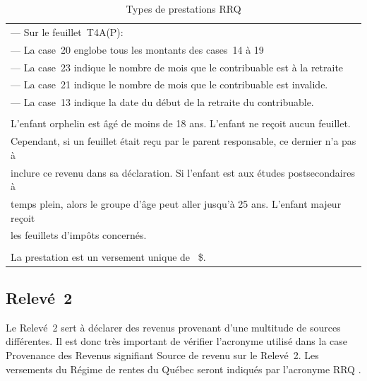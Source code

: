 \begin{table}
\begin{tabular}{|l|c|c|l|}
		\multicolumn{4}{|l|}{--- Sur le feuillet~T4A(P):}                                                            \\
		\multicolumn{4}{|l|}{\quad --- La case~20 englobe tous les montants des cases~14 à 19}                       \\
		\multicolumn{4}{|l|}{\quad --- La case~23 indique le nombre de mois que le contribuable est à la retraite}   \\
		\multicolumn{4}{|l|}{\quad --- La case~21 indique le nombre de mois que le contribuable est invalide.}       \\
		\multicolumn{4}{|l|}{\quad --- La case~13 indique la date du début de la retraite du contribuable.}          \\
		\multicolumn{4}{|l|}{ }                                                                                      \\
		\multicolumn{4}{|l|}{\up{1}L'enfant orphelin est âgé de moins de 18 ans. L'enfant ne reçoit aucun feuillet.} \\
		\multicolumn{4}{|l|}{Cependant, si un feuillet était reçu par le parent responsable, ce dernier n'a pas à}   \\
		\multicolumn{4}{|l|}{inclure ce revenu dans sa déclaration. Si l'enfant est aux études postsecondaires à}    \\
		\multicolumn{4}{|l|}{temps plein, alors le groupe d'âge peut aller jusqu'à 25 ans. L'enfant majeur reçoit}   \\
		\multicolumn{4}{|l|}{les feuillets d'impôts concernés.}                                                      \\
		\multicolumn{4}{|l|}{ }                                                                                      \\
		\multicolumn{4}{|l|}{\up{2}La prestation est un versement unique de \numprint{2500}~\$.}                     \\ \hline
	\end{tabular}
	\caption{Types de prestations RRQ}
	\label{table:prestationsRRQ}
\end{table}


\subsection{Relevé~2}
Le Relevé~2 sert à déclarer des revenus provenant d'une multitude de sources différentes. Il est donc très important de vérifier l'acronyme utilisé dans la case \og Provenance des Revenus \fg{} signifiant \og Source de revenu \fg{} sur le Relevé~2. Les versements du Régime de rentes du Québec seront indiqués par l'acronyme
\og RRQ \fg{}.


